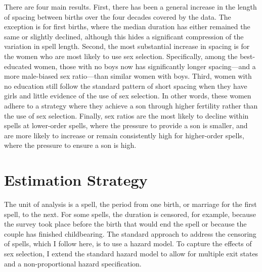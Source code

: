 \documentclass[12pt,letterpaper]{article}
\begin{document}
There are four main results.
First, there has been a general increase in the length of spacing between births
over the four decades covered by the data.
The exception is for first births, where the median duration has either
remained the same or slightly declined, although this hides a
significant compression of the variation in spell length.
Second, the most substantial increase in spacing is for the women who
are most likely to use sex selection.
Specifically, among the best-educated women, those with no boys now has 
significantly longer spacing---and a more male-biased sex ratio---than 
similar women with boys.
Third, women with no education still follow the standard pattern of
short spacing when they have girls and little evidence of the use of sex
selection.
In other words, these women adhere to a strategy where they achieve a
son through higher fertility rather than the use of sex selection.
Finally, sex ratios are the most likely to decline within spells at
lower-order spells, where the pressure to provide a son is smaller, and
are more likely to increase or remain consistently high for higher-order
spells, where the pressure to ensure a son is high.





\section{Estimation Strategy\label{sec:strategy}}


The unit of analysis is a spell, the period from one birth, or marriage for
the first spell, to the next.
For some spells, the duration is censored, for example, because the survey
took place before the birth that would end the spell or because the couple
has finished childbearing.
The standard approach to address the censoring of spells, which I follow here, is 
to use a hazard model.
To capture the effects of sex selection, I extend the standard hazard model 
to allow for multiple exit states and a non-proportional hazard specification.
\end{document}
